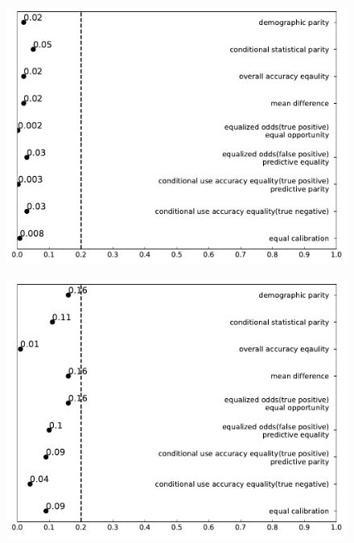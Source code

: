 \documentclass[conference]{IEEEtran}
\begin{document}
\begin{figure}[h]
\begin{minipage}[b]{0.48\linewidth}
        \includegraphics[width=\linewidth]{25 - 45}
        \label{fig:2}
    \end{minipage}
    \hfill
    \begin{minipage}[b]{0.48\linewidth}
        \centering
        \includegraphics[width=\linewidth]{Misdemeanor}
        \label{fig:2}
    \end{minipage}
    \hfill
    \begin{minipage}[b]{0.48\linewidth}
        \centering

\end{minipage}
\end{figure}
\end{document}
